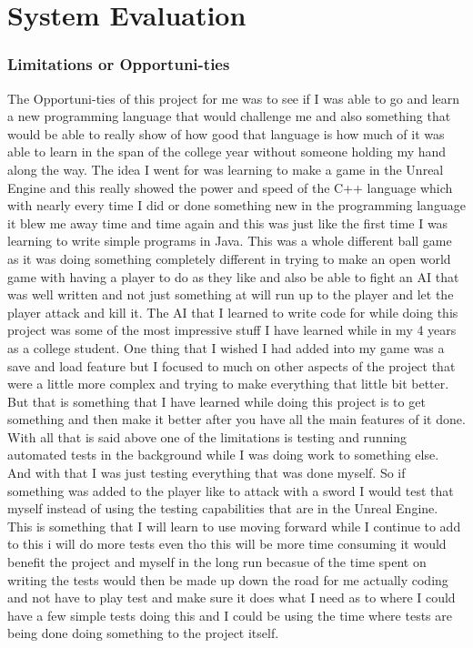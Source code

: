 \chapter{System Evaluation}
\subsection{Limitations or Opportuni-ties}
The Opportuni-ties of this project for me was to see if I was able to go and learn a new programming language that would challenge me and also something that would be able to really show of how good that language is how much of it was able to learn in the span of the college year without someone holding my hand along the way. The idea I went for was learning to make a game in the Unreal Engine and this really showed the power and speed of the C++ language which with nearly every time I did or done something new in the programming language it blew me away time and time again and this was just like the first time I was learning to write simple programs in Java. This was a whole different ball game as it was doing something completely different in trying to make an open world game with having a player to do as they like and also be able to fight an AI that was well written and not just something at will run up to the player and let the player attack and kill it. The AI that I learned to write code for while doing this project was some of the most impressive stuff I have learned while in my 4 years as a college student. One thing that I wished I had added into my game was a save and load feature but I focused to much on other aspects of the project that were a little more complex and trying to make everything that little bit better. But that is something that I have learned while doing this project is to get something and then make it better after you have all the main features of it done.
\newline
\newline
With all that is said above one of the limitations is testing and running automated tests in the background while I was doing work to something else. And with that I was just testing everything that was done myself. So if something was added to the player like to attack with a sword I would test that myself instead of using the testing capabilities that are in the Unreal Engine. This is something that I will learn to use moving forward while I continue to add to this i will do more tests even tho this will be more time consuming it would benefit the project and myself in the long run becasue of the time spent on writing the tests would then be made up down the road for me actually coding and not have to play test and make sure it does what I need as to where I could have a few simple tests doing this and I could be using the time where tests are being done doing something to the project itself.

